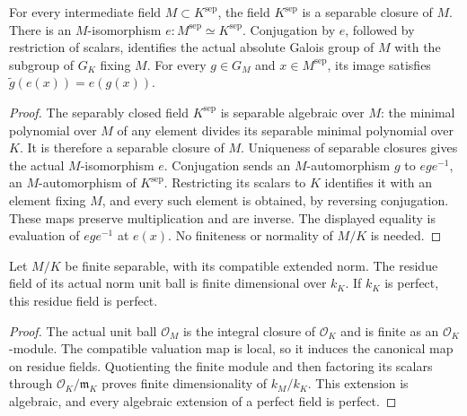 \begin{lemma}
\label{fw:apf-base-separable-closure}
\leanok
For every intermediate field $M\subset K^{\mathrm{sep}}$, the field
$K^{\mathrm{sep}}$ is a separable closure of $M$. There is an
$M$-isomorphism
$e:M^{\mathrm{sep}}\simeq K^{\mathrm{sep}}$. Conjugation by $e$,
followed by restriction of scalars, identifies the actual absolute
Galois group of $M$ with the subgroup of $G_K$ fixing $M$.
For every $g\in G_M$ and $x\in M^{\mathrm{sep}}$, its image satisfies
$\widetilde g(e(x))=e(g(x))$.
\end{lemma}
\begin{proof}
The separably closed field $K^{\mathrm{sep}}$ is separable algebraic over
$M$: the minimal polynomial over $M$ of any element divides its
separable minimal polynomial over $K$. It is therefore a separable
closure of $M$. Uniqueness of separable closures gives the actual
$M$-isomorphism $e$. Conjugation sends an $M$-automorphism $g$ to
$ege^{-1}$, an $M$-automorphism of $K^{\mathrm{sep}}$. Restricting its
scalars to $K$ identifies it with an element fixing $M$, and every such
element is obtained, by reversing conjugation. These maps preserve
multiplication and are inverse. The displayed equality is evaluation
of $ege^{-1}$ at $e(x)$. No finiteness or normality of $M/K$ is needed.
\end{proof}

\begin{lemma}
\label{fw:finite-base-residue}
\leanok
Let $M/K$ be finite separable, with its compatible extended norm.
The residue field of its actual norm unit ball is finite dimensional
over $k_K$. If $k_K$ is perfect, this residue field is perfect.
\end{lemma}
\begin{proof}
The actual unit ball $\mathcal O_M$ is the integral closure of
$\mathcal O_K$ and is finite as an $\mathcal O_K$-module. The compatible
valuation map is local, so it induces the canonical map on residue
fields. Quotienting the finite module and then factoring its scalars
through $\mathcal O_K/\mathfrak m_K$ proves finite dimensionality of
$k_M/k_K$. This extension is algebraic, and every algebraic extension
of a perfect field is perfect.
\end{proof}

